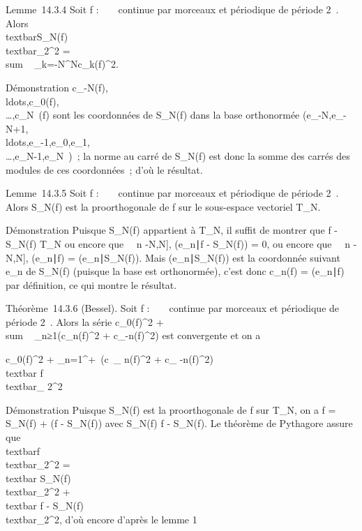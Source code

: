 \documentclass[]{article}
\begin{document}
Lemme~14.3.4 Soit f : ~ \rightarrow~  continue par morceaux et périodique de
période 2\pi~. Alors
\\textbar{}S\_N(f)\\textbar{}\_2^2
= \\sum ~
\_k=-N^N\textbar{}c\_k(f)\textbar{}^2.

Démonstration
c\_-N(f),\\ldots,c\_0(f),\\\ldots,c\_N~(f)
sont les coordonnées de S\_N(f) dans la base orthonormée
(e\_-N,e\_-N+1,\\ldots,e\_-1,e\_0,e\_1,\\\ldots,e\_N-1,e\_N~)~;
la norme au carré de S\_N(f) est donc la somme des carrés des
modules de ces coordonnées~; d'où le résultat.

Lemme~14.3.5 Soit f : ~ \rightarrow~  continue par morceaux et périodique de
période 2\pi~. Alors S\_N(f) est la pro\jmathection orthogonale de f sur
le sous-espace vectoriel T\_N.

Démonstration Puisque S\_N(f) appartient à T\_N, il
suffit de montrer que f - S\_N(f) \bot T\_N ou encore que
\forall~~n \in {[}-N,N{]},
(e\_n∣f - S\_N(f)) = 0, ou
encore que \forall~~n \in {[}-N,N{]},
(e\_n∣f) =
(e\_n∣S\_N(f)). Mais
(e\_n∣S\_N(f)) est la
coordonnée suivant e\_n de S\_N(f) (puisque la base est
orthonormée), c'est donc c\_n(f) =
(e\_n∣f) par définition, ce qui
montre le résultat.

Théorème~14.3.6 (Bessel). Soit f : ~ \rightarrow~  continue par morceaux et
périodique de période 2\pi~. Alors la série
\textbar{}c\_0(f)\textbar{}^2
+ \\sum ~
\_n≥1(\textbar{}c\_n(f)\textbar{}^2 +
\textbar{}c\_-n(f)\textbar{}^2) est convergente et on
a

\textbar{}c\_0(f)\textbar{}^2 +
\sum \_n=1^+\infty~(\textbar{}c~\_
n(f)\textbar{}^2 + \textbar{}c\_
-n(f)\textbar{}^2) \leq\\textbar{}
f\\textbar{}\_ 2^2

Démonstration Puisque S\_N(f) est la pro\jmathection orthogonale de f
sur T\_N, on a f = S\_N(f) + (f - S\_N(f)) avec
S\_N(f) \bot f - S\_N(f). Le théorème de Pythagore assure
que
\\textbar{}f\\textbar{}\_2^2
=\\textbar{}
S\_N(f)\\textbar{}\_2^2
+\\textbar{} f -
S\_N(f)\\textbar{}\_2^2, d'où
encore d'après le lemme 1
\end{document}
